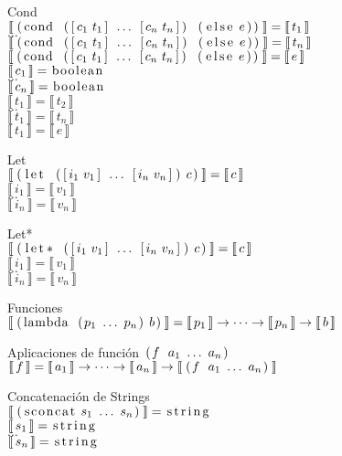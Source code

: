 \documentclass{article}
\newcommand{\cd}[1]{\text{\lstinline[columns=fixed]{#1}}}
\newcommand{\lbr}{\llbracket}
\newcommand{\rbr}{\rrbracket}
\newcommand{\typx}[1]{\lbr\, #1 \,\rbr}
\begin{document}
  \clearpage

  Cond\\
  $\typx{\cd{(cond ([}c_1\ t_1\cd{]}\ \dots\ \cd{[}c_n\ t_n\cd{]) (else}\ e\cd{))}} = \typx{t_1}$\\
  $\dots$\\
  $\typx{\cd{(cond ([}c_1\ t_1\cd{]}\ \dots\ \cd{[}c_n\ t_n\cd{]) (else}\ e\cd{))}} = \typx{t_n}$\\
  $\typx{\cd{(cond ([}c_1\ t_1\cd{]}\ \dots\ \cd{[}c_n\ t_n\cd{]) (else}\ e\cd{))}} = \typx{e}$\\
  $\typx{c_1} = \cd{boolean}$\\
  $\dots$\\
  $\typx{c_n} = \cd{boolean}$\\
  $\typx{t_1} = \typx{t_2}$\\
  $\dots$\\
  $\typx{t_1} = \typx{t_n}$\\
  $\typx{t_1} = \typx{e}$

  Let\\
  $\typx{\cd{(let ([}i_1\ v_1\cd{]}\ \dots\ \cd{[}i_n\ v_n\cd{]}\cd{)}\ c\cd{)}} = \typx{c}$\\
  $\typx{i_1} = \typx{v_1}$\\
  $\dots$\\
  $\typx{i_n} = \typx{v_n}$

  Let*\\
  $\typx{\cd{(let* ([}i_1\ v_1\cd{]}\ \dots\ \cd{[}i_n\ v_n\cd{]}\cd{)}\ c\cd{)}} = \typx{c}$\\
  $\typx{i_1} = \typx{v_1}$\\
  $\dots$\\
  $\typx{i_n} = \typx{v_n}$


  Funciones\\
  $\typx{\cd{(lambda (}p_1\ \dots\ p_n\cd{)}\ b\cd{)}} = \typx{p_1} \rightarrow \dots \rightarrow \typx{p_n} \rightarrow \typx{b}$

  Aplicaciones de función $\cd{(}f\ \ a_1\ \dots\ a_n\cd{)}$\\
  $\typx{f} = \typx{a_1} \rightarrow \dots \rightarrow \typx{a_n} \rightarrow \typx{\cd{(}f\ \ a_1\ \dots\ a_n\cd{)}}$

  Concatenación de Strings\\
  $\typx{\cd{(sconcat}\ s_1\ \dots\ s_n\cd{)}} = \cd{string}$\\
  $\typx{s_1} = \cd{string}$\\
  $\dots$\\
  $\typx{s_n} = \cd{string}$
\end{document}
